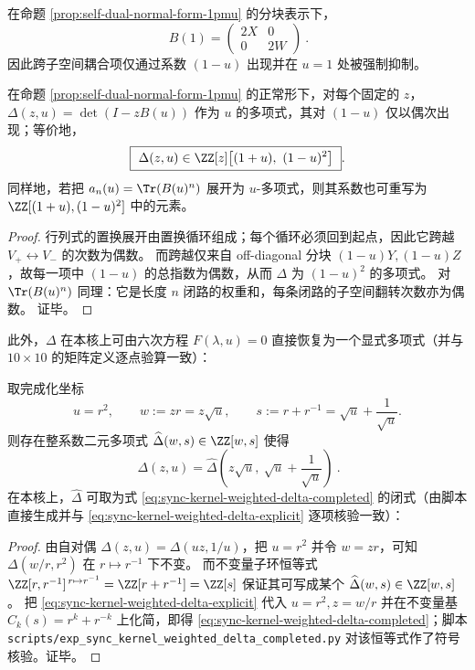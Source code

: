 \begin{corollary}[\texorpdfstring{$u=1$}{u=1} 的强制解耦]\label{cor:self-dual-u1-decouple}
在命题 \ref{prop:self-dual-normal-form-1pmu} 的分块表示下，
\[
\boxed{\ B(1)=
\begin{pmatrix}
2X & 0\\
0 & 2W
\end{pmatrix}\ }.
\]
因此跨子空间耦合项仅通过系数 \((1-u)\) 出现并在 \(u=1\) 处被强制抑制。
\end{corollary}

\begin{corollary}\label{cor:self-dual-delta-even-in-1mu}
在命题 \ref{prop:self-dual-normal-form-1pmu} 的正常形下，对每个固定的 \(z\)，
\(\Delta(z,u)=\det(I-zB(u))\)
作为 \(u\) 的多项式，其对 \((1-u)\) 仅以偶次出现；等价地，
\[
\boxed{\ \Delta(z,u)\in \ZZ[z]\bigl[(1+u),\ (1-u)^2\bigr]\ }.
\]
同样地，若把 \(a_n(u)=\Tr(B(u)^n)\) 展开为 \(u\)-多项式，则其系数也可重写为 \(\ZZ[(1+u),(1-u)^2]\) 中的元素。
\end{corollary}
\begin{proof}
行列式的置换展开由置换循环组成；每个循环必须回到起点，因此它跨越 \(V_+\leftrightarrow V_-\) 的次数为偶数。
而跨越仅来自 off-diagonal 分块 \((1-u)Y,(1-u)Z\)，故每一项中 \((1-u)\) 的总指数为偶数，从而 \(\Delta\) 为 \((1-u)^2\) 的多项式。
对 \(\Tr(B(u)^n)\) 同理：它是长度 \(n\) 闭路的权重和，每条闭路的子空间翻转次数亦为偶数。
证毕。
\end{proof}

此外，\(\Delta\) 在本核上可由六次方程 \(F(\lambda,u)=0\) 直接恢复为一个显式多项式（并与 \(10\times 10\) 的矩阵定义逐点验算一致）：

\begin{proposition}[完成化行列式的二元闭式：\texorpdfstring{$\Delta(z,u)=\widehat\Delta(w,s)$}{Delta=hatDelta}]\label{prop:sync-kernel-weighted-hat-delta}
取完成化坐标
\[
u=r^2,\qquad w:=zr=z\sqrt{u},\qquad s:=r+r^{-1}=\sqrt{u}+\frac{1}{\sqrt{u}}.
\]
则存在整系数二元多项式 \(\widehat\Delta(w,s)\in\ZZ[w,s]\) 使得
\[
\boxed{\ \Delta(z,u)=\widehat\Delta\!\left(z\sqrt{u},\ \sqrt{u}+\frac{1}{\sqrt{u}}\right)\ }.
\]
在本核上，\(\widehat\Delta\) 可取为式 \eqref{eq:sync-kernel-weighted-delta-completed} 的闭式（由脚本直接生成并与 \eqref{eq:sync-kernel-weighted-delta-explicit} 逐项核验一致）：

\end{proposition}
\begin{proof}
由自对偶 \(\Delta(z,u)=\Delta(uz,1/u)\)，把 \(u=r^2\) 并令 \(w=zr\)，可知
\(
\Delta(w/r,r^2)
\)
在 \(r\mapsto r^{-1}\) 下不变。
而不变量子环恒等式
\(
\ZZ[r,r^{-1}]^{\,r\mapsto r^{-1}}=\ZZ[r+r^{-1}]=\ZZ[s]
\)
保证其可写成某个 \(\widehat\Delta(w,s)\in\ZZ[w,s]\)。
把 \eqref{eq:sync-kernel-weighted-delta-explicit} 代入 \(u=r^2,z=w/r\) 并在不变量基 \(C_k(s)=r^k+r^{-k}\) 上化简，即得 \eqref{eq:sync-kernel-weighted-delta-completed}；脚本 \texttt{scripts/exp\_sync\_kernel\_weighted\_delta\_completed.py} 对该恒等式作了符号核验。证毕。
\end{proof}

